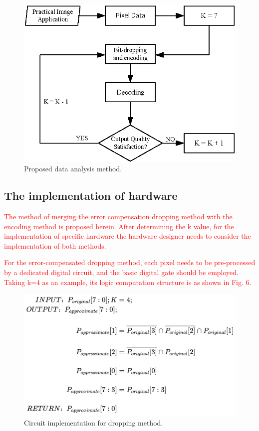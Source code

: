 \documentclass[lettersize,journal]{IEEEtran}
\begin{document}
 \begin{figure}[htb]
 	\centering
 	\includegraphics[width=\linewidth]{Fig/Proposed data analysis method.png}
 	\caption{Proposed data analysis method.}
 	\label{fig5}
 \end{figure}

{\color{red}\subsection{The implementation of hardware}}

\textcolor{red}{The method of merging the error compensation dropping method with the encoding method is proposed herein. After determining the k value, for the implementation of specific hardware the hardware designer needs to consider the implementation of both methods.}

\textcolor{red}{For the error-compensated dropping method, each pixel needs to be pre-processed by a dedicated digital circuit, and the basic digital gate should be employed. Taking k=4 as an example, its logic computation structure is as shown in Fig. 6.}


 \begin{figure}[htb]
 	\centering
 	\includegraphics[width=\linewidth]{Fig/Circuit implementation for dropping method.png}
 	{\color{red}\caption{Circuit implementation for dropping method.}}
 	\label{fig6}
 \end{figure}
\end{document}
